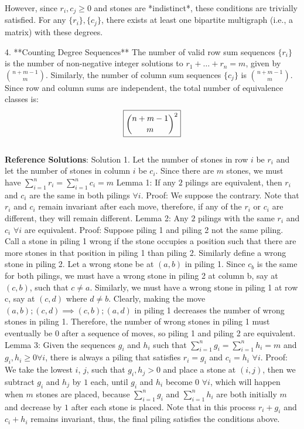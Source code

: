 {   However, since \( r_i, c_j \geq 0 \) and stones are *indistinct*, these conditions are trivially satisfied. For any \( \{r_i\}, \{c_j\} \), there exists at least one bipartite multigraph (i.e., a matrix) with these degrees.

4. **Counting Degree Sequences**  
   The number of valid row sum sequences \( \{r_i\} \) is the number of non-negative integer solutions to \( r_1 + \dots + r_n = m \), given by \( \binom{n + m - 1}{m} \). Similarly, the number of column sum sequences \( \{c_j\} \) is \( \binom{n + m - 1}{m} \). Since row and column sums are independent, the total number of equivalence classes is:
   \[
   \boxed{\dbinom{n + m - 1}{m}^2}
   \] \\
    \textbf{Reference Solutions}: Solution 1. Let the number of stones in row $i$ be $r_i$ and let the number of stones in column $i$ be $c_i$. Since there are $m$ stones, we must have $\sum_{i=1}^n r_i=\sum_{i=1}^n c_i=m$
Lemma 1: If any $2$ pilings are equivalent, then $r_i$ and $c_i$ are the same in both pilings $\forall i$.
Proof: We suppose the contrary. Note that $r_i$ and $c_i$ remain invariant after each move, therefore, if any of the $r_i$ or $c_i$ are different, they will remain different.
Lemma 2: Any $2$ pilings with the same $r_i$ and $c_i$ $\forall i$ are equivalent.
Proof: Suppose piling 1 and piling 2 not the same piling. Call a stone in piling 1 wrong if the stone occupies a position such that there are more stones in that position in piling 1 than piling 2. Similarly define a wrong stone in piling 2. Let a wrong stone be at $(a, b)$ in piling 1. Since $c_b$ is the same for both pilings, we must have a wrong stone in piling 2 at column b, say at $(c, b)$, such that $c\not = a$. Similarly, we must have a wrong stone in piling 1 at row c, say at $(c, d)$ where $d \not = b$. Clearly, making the move $(a,b);(c,d) \implies (c,b);(a,d)$ in piling 1 decreases the number of wrong stones in piling 1. Therefore, the number of wrong stones in piling 1 must eventually be $0$ after a sequence of moves, so piling 1 and piling 2 are equivalent.
Lemma 3: Given the sequences $g_i$ and $h_i$ such that $\sum_{i=1}^n g_i=\sum_{i=1}^n h_i=m$ and $g_i, h_i\geq 0 \forall i$, there is always a piling that satisfies $r_i=g_i$ and $c_i=h_i$ $\forall i$.
Proof: We take the lowest $i$, $j$, such that $g_i, h_j >0$ and place a stone at $(i, j)$, then we subtract $g_i$ and $h_j$ by $1$ each, until $g_i$ and $h_i$ become $0$ $\forall i$, which will happen when $m$ stones are placed, because $\sum_{i=1}^n g_i$ and $\sum_{i=1}^n h_i$ are both initially $m$ and decrease by $1$ after each stone is placed. Note that in this process $r_i+g_i$ and $c_i+h_i$ remains invariant, thus, the final piling satisfies the conditions above.
}
